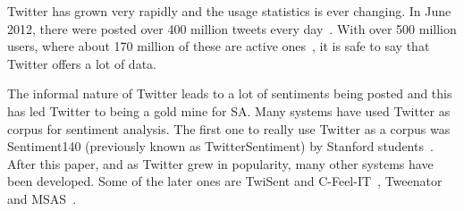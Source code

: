 Twitter has grown very rapidly and the usage statistics is ever changing. In June 2012, there were posted over 400 million tweets every day~\citep{site:twitterusage}. With over 500 million users, where about 170 million of these are active ones~\citep{site:users}, it is safe to say that Twitter offers a lot of data.


The informal nature of Twitter leads to a lot of sentiments being posted and this has led Twitter to being a gold mine for SA. Many systems have used Twitter as corpus for sentiment analysis. The first one to really use Twitter as a corpus was Sentiment140 (previously known as TwitterSentiment) by Stanford students~\citep{article:go}. After this paper, and as Twitter grew in popularity, many other systems have been developed. Some of the later ones are TwiSent and C-Feel-IT~\citep{mukherjee2012twisent}, Tweenator~\citep{saif2012semantic} and MSAS~\citep{chamlertwat2012discovering}.